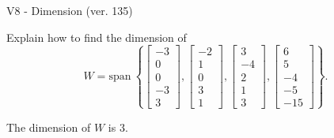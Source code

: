\begin{exercise}
  \begin{exerciseTitle}V8 - Dimension (ver. 135)\end{exerciseTitle}
  \begin{exerciseStatement}
    Explain how to find the dimension of 
\[W=\mathrm{span}\ \left\{\left[\begin{array}{r}
-3 \\
0 \\
0 \\
-3 \\
3
\end{array}\right] , \left[\begin{array}{r}
-2 \\
1 \\
0 \\
3 \\
1
\end{array}\right] , \left[\begin{array}{r}
3 \\
-4 \\
2 \\
1 \\
3
\end{array}\right] , \left[\begin{array}{r}
6 \\
5 \\
-4 \\
-5 \\
-15
\end{array}\right]\right\}.\]



  \end{exerciseStatement}
  \begin{exerciseAnswer}
   The dimension of \(W\) is  \(3\).
  


  \end{exerciseAnswer}
\end{exercise}